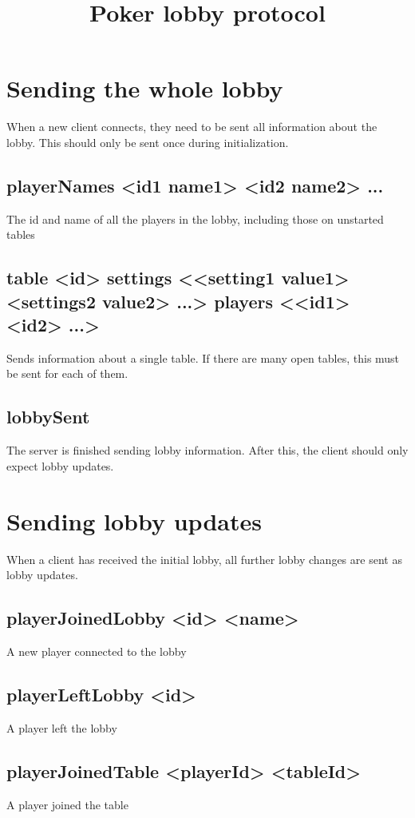 \documentclass{article}
\title{Poker lobby protocol}
\begin{document}
\maketitle

\section{Sending the whole lobby}
When a new client connects, they need to be sent all information about the lobby. This should only be sent once during initialization.

\subsection*{playerNames <id1 name1> <id2 name2> ...}
The id and name of all the players in the lobby, including those on unstarted tables

\subsection*{table <id> settings <{}<setting1 value1> <settings2 value2> ...> players <{}<id1> <id2> ...>}
Sends information about a single table. If there are many open tables, this must be sent for each of them.

\subsection*{lobbySent}
The server is finished sending lobby information. After this, the client should only expect lobby updates.


\section{Sending lobby updates}
When a client has received the initial lobby, all further lobby changes are sent as lobby updates.

\subsection*{playerJoinedLobby <id> <name>}
A new player connected to the lobby

\subsection*{playerLeftLobby <id>}
A player left the lobby

\subsection*{playerJoinedTable <playerId> <tableId>}
A player joined the table
\end{document}
